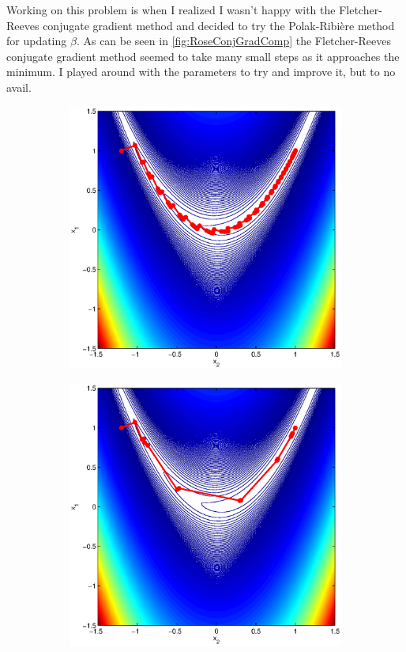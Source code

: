 \documentclass[12pt,parskip=full]{article}
\numberwithin{subsection}{section}
\begin{document}
		Working on this problem is when I realized I wasn't happy with the Fletcher-Reeves conjugate gradient method
		and decided to try the Polak-Ribi\`{e}re method for updating $\beta$. As can be seen in \cref{fig:RoseConjGradComp}
		the Fletcher-Reeves conjugate gradient method seemed to take many small steps as it approaches the minimum.
		I played around with the parameters to try and improve it, but to no avail.
		\begin{figure}[!ht]
			\centering
			\begin{subfigure}[h]{0.4\textwidth}
				\includegraphics[width=\textwidth]{ConjGradFRRose.eps}
			\end{subfigure}
			\begin{subfigure}[h]{0.4\textwidth}
				\includegraphics[width=\textwidth]{ConjGradPRRose.eps}

\end{subfigure}
\end{figure}
\end{document}
